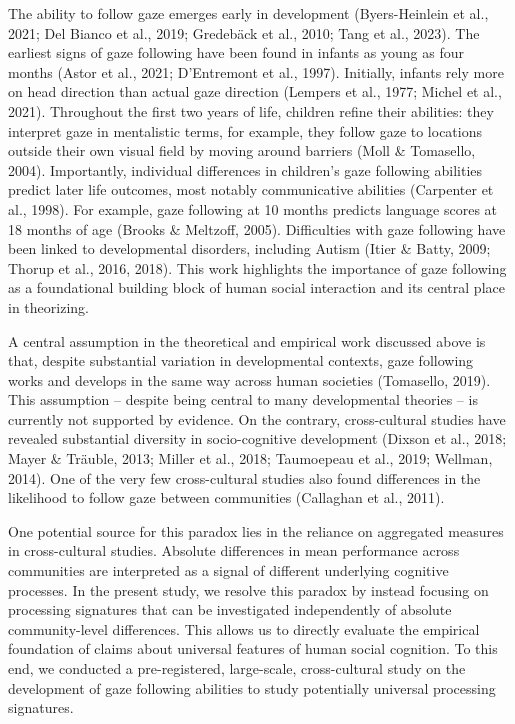 \documentclass[
  man,floatsintext]{apa7}
\begin{document}
The ability to follow gaze emerges early in development (Byers-Heinlein et al., 2021; Del Bianco et al., 2019; Gredebäck et al., 2010; Tang et al., 2023). The earliest signs of gaze following have been found in infants as young as four months (Astor et al., 2021; D'Entremont et al., 1997). Initially, infants rely more on head direction than actual gaze direction (Lempers et al., 1977; Michel et al., 2021). Throughout the first two years of life, children refine their abilities: they interpret gaze in mentalistic terms, for example, they follow gaze to locations outside their own visual field by moving around barriers (Moll \& Tomasello, 2004). Importantly, individual differences in children's gaze following abilities predict later life outcomes, most notably communicative abilities (Carpenter et al., 1998). For example, gaze following at 10 months predicts language scores at 18 months of age (Brooks \& Meltzoff, 2005). Difficulties with gaze following have been linked to developmental disorders, including Autism (Itier \& Batty, 2009; Thorup et al., 2016, 2018). This work highlights the importance of gaze following as a foundational building block of human social interaction and its central place in theorizing.

A central assumption in the theoretical and empirical work discussed above is that, despite substantial variation in developmental contexts, gaze following works and develops in the same way across human societies (Tomasello, 2019). This assumption -- despite being central to many developmental theories -- is currently not supported by evidence. On the contrary, cross-cultural studies have revealed substantial diversity in socio-cognitive development (Dixson et al., 2018; Mayer \& Träuble, 2013; Miller et al., 2018; Taumoepeau et al., 2019; Wellman, 2014). One of the very few cross-cultural studies also found differences in the likelihood to follow gaze between communities (Callaghan et al., 2011).

One potential source for this paradox lies in the reliance on aggregated measures in cross-cultural studies. Absolute differences in mean performance across communities are interpreted as a signal of different underlying cognitive processes. In the present study, we resolve this paradox by instead focusing on processing signatures that can be investigated independently of absolute community-level differences. This allows us to directly evaluate the empirical foundation of claims about universal features of human social cognition. To this end, we conducted a pre-registered, large-scale, cross-cultural study on the development of gaze following abilities to study potentially universal processing signatures.
\end{document}
